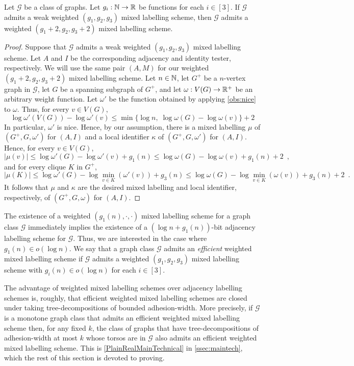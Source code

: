\documentclass{patmorin}
\renewcommand{\le}{\leqslant}
\renewcommand{\leq}{\leqslant}
\newcommand{\pat}[1]{\noindent\textcolor{Magenta}{PaMo: #1}}
\newcommand{\piotr}[1]{\noindent\textcolor{red}{PiMi: #1}}
\newcommand{\defin}[1]{\emph{\textcolor{brightmaroon}{#1}}}
\begin{document}
\begin{lem}
    \label{lem:nice_weights}
    Let $\mathcal{G}$ be a class of graphs.
    Let $g_i:\mathbb{N}\to\mathbb{R}$ be functions for each $i\in[3]$.
    If $\mathcal{G}$ admits a weak weighted $(g_1,g_2,g_3)$ mixed labelling scheme, then $\mathcal{G}$ admits a weighted $(g_1+2,g_2,g_3+2)$ mixed labelling scheme. %
\end{lem}
\begin{proof}
    Suppose that $\mathcal{G}$ admits a weak weighted $(g_1,g_2,g_3)$ mixed labelling scheme.
    Let $A$ and $I$ be the corresponding adjacency and identity tester, respectively.
    We will use the same pair $(A, M)$ for our weighted $(g_1+2,g_2,g_3+2)$ mixed labelling scheme.
    Let $n\in \mathbb{N}$, let $G^+$ be a  $n$-vertex graph in $\mathcal{G}$, let $G$ be a spanning subgraph of $G^+$, and let $\omega:V(G)\to \mathbb{R}^+$ be an arbitrary weight function.
    Let $\omega'$ be the function obtained by applying \cref{obs:nice} to $\omega$.
    Thus, for every $v\in V(G)$,
\[
      \log\omega'(V(G))-\log\omega'(v)\le\min\{\log n,\;\log\omega(G)-\log\omega(v)\}+2
    \]
    In particular, $\omega'$ is nice.
    Hence, by our assumption, there is a mixed labelling $\mu$ of $(G^+,G,\omega')$ for $(A,I)$ and a local identifier $\kappa$ of $(G^+,G,\omega')$ for $(A,I)$.
    Hence, for every $v\in V(G)$, 
    \[
    |\mu(v)| \leq \log \omega'(G) - \log\omega'(v) + g_1(n) \leq \log \omega(G) - \log\omega(v) + g_1(n) + 2\enspace,
    \]
    and  for every clique $K$ in $G^+$, 
    \[
    |\mu(K)|\le \log \omega'(G) - \log\min_{v\in K}(\omega'(v)) + g_3(n)
    \leq \log \omega(G) - \log\min_{v\in K}(\omega(v)) + g_3(n) + 2\enspace.
    \]
    It follows that $\mu$ and  $\kappa$ are the desired  mixed labelling and local identifier, respectively,  of $(G^+,G,\omega)$ for $(A,I)$.
\end{proof}


The existence of a weighted $(g_1(n),\cdot,\cdot)$ mixed labelling scheme for a graph class $\mathcal{G}$ immediately implies the existence of a $(\log n+g_1(n))$-bit adjacency labelling scheme for $\mathcal{G}$. Thus, we are interested in the case where $g_1(n)\in o(\log n)$. We say that a graph class $\mathcal{G}$ admits an \defin{efficient} weighted mixed labelling scheme if $\mathcal{G}$ admits a weighted $(g_1,g_2,g_3)$ mixed labelling scheme with $g_i(n)\in o(\log n)$ for each $i\in [3]$.

The advantage of weighted mixed labelling schemes over adjacency labelling schemes is, roughly, that efficient weighted mixed labelling schemes are closed under taking tree-decompositions of bounded adhesion-width. More precisely, if $\mathcal{G}$ is a monotone graph class that admits an efficient weighted mixed labelling scheme then, for any fixed $k$, the class of graphs that have tree-decompositions of adhesion-width at most $k$ whose torsos are in $\mathcal{G}$ also admits an efficient weighted mixed labelling scheme. This is \cref{PlainRealMainTechnical} in \cref{ssec:maintech}, which the rest of this section is devoted to proving.
\end{document}
